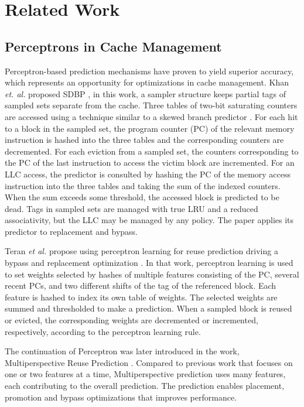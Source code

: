 \section{Related Work}
\label{related}

\subsection{Perceptrons in Cache Management}

Perceptron-based prediction mechanisms have proven to yield superior accuracy, which represents an opportunity for optimizations in cache management. 
Khan \textit{et. al.} proposed SDBP \cite{sdbp}, in this work, a sampler structure keeps partial tags of sampled sets separate from the cache. Three tables of two-bit saturating counters are accessed using a technique similar to a skewed branch predictor \cite{Piece_Linear}. For each hit to a block in the sampled set, the program counter (PC) of the relevant memory instruction is hashed into the three tables and the corresponding counters are decremented. For each eviction from a sampled set, the counters corresponding to the PC of the last instruction to access the victim block are incremented. For an LLC access, the predictor is consulted by hashing the PC of the memory access instruction into the three tables and taking the sum of the indexed counters. When the sum exceeds some threshold, the accessed block is predicted to be dead. Tags in sampled sets are managed with true LRU and a reduced associativity, but the LLC may be managed by any policy. The paper applies its predictor to replacement and bypass.

Teran \textit{et al.} propose using perceptron learning for reuse prediction driving a bypass and replacement optimization \cite{Perc_Reuse}. In that work, perceptron learning is used to set weights selected by hashes of multiple features consisting of the PC, several recent PCs, and two different shifts of the tag of the referenced block. Each feature is hashed to index its own table of weights. The selected weights are summed and thresholded to make a prediction. When a sampled block is reused or evicted, the corresponding weights are decremented or incremented, respectively, according to the perceptron learning rule. 

The continuation of Perceptron was later introduced in the work, Multiperspective Reuse Prediction \cite{Multiperspective}. Compared to previous work that focuses on one or two features at a time, Multiperspective prediction uses many features, each contributing to the overall prediction. The prediction enables placement, promotion and bypass optimizations that improves performance.  


